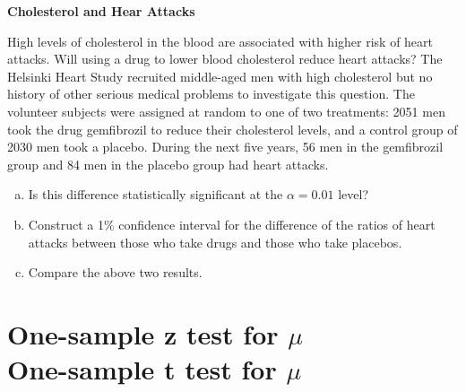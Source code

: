 \documentclass[a4paper, 12pt,twoside]{book}
\begin{document}
\colorbox{champagne}{\parbox{\textwidth}{
\textbf{Cholesterol and Hear Attacks}\vspace{0.3cm}

High levels of cholesterol in the blood are associated with higher risk of heart attacks. Will using a drug to lower blood cholesterol reduce heart attacks? The Helsinki Heart Study recruited middle-aged men with high cholesterol but no history of other serious medical problems to investigate this question. The volunteer subjects were assigned at random to one of two treatments: 2051 men took the drug gemfibrozil to reduce their cholesterol levels, and a control group of 2030 men took a placebo. During the next five years, 56 men in the gemfibrozil group and 84 men in the placebo group had heart attacks. 
\begin{enumerate}[(a)]
\item Is this difference statistically significant at the $\alpha = 0.01$ level?
\item Construct a 1\% confidence interval for the difference of the ratios of heart attacks between those who take drugs and those who take placebos.
\item Compare the above two results.
\end{enumerate}
}}
\newpage
\section{One-sample z test for $\mu$\\ One-sample t test for $\mu$}
\end{document}
